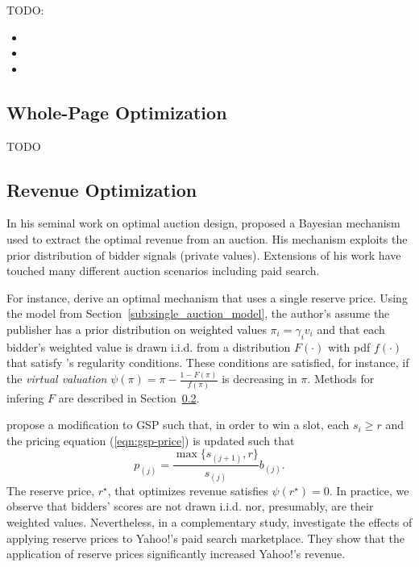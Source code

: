 \documentclass[prodmode,acmtist]{acmsmall} %
\begin{document}
TODO:
\begin{itemize}
	\item {}
	\item {}
	\item {}
\end{itemize}	



\subsection{Whole-Page Optimization} %
\label{sub:whole_page_optimization}

TODO



\subsection{Revenue Optimization} %
\label{sub:revenue_optimization}

In his seminal work on optimal auction design,  proposed a Bayesian mechanism used to extract the optimal revenue from an auction.
His mechanism exploits the prior distribution of bidder signals (private values).
Extensions of his work have touched many different auction scenarios including paid search. 

For instance,  derive an optimal mechanism that uses a single reserve price.
Using the model from Section~\ref{sub:single_auction_model}, the author's assume the publisher has a prior distribution on weighted values $\pi_i = \gamma_i v_i$ and that each bidder's weighted value is drawn i.i.d. from a distribution $F(\cdot)$ with pdf $f(\cdot)$ that satisfy 's regularity conditions.
These conditions are satisfied, for instance, if the \emph{virtual valuation} $\psi(\pi) = \pi - \frac{1 - F(\pi)}{f(\pi)}$ is decreasing in $\pi$.
Methods for infering $F$ are described in Section~\ref{sub:revenue_optimization}.

 propose a modification to GSP such that, in order to win a slot, each $s_i \ge r$ and the pricing equation (\ref{eqn:gsp-price}) is updated such that
\begin{equation}
p_{(j)} = \frac{\max\{s_{(j+1)},r\}}{s_{(j)}} b_{(j)}.
\label{eqn:gsp-reserve-price}	
\end{equation}
The reserve price, $r^\star$, that optimizes revenue satisfies $\psi(r^\star) = 0$.
In practice, we observe that bidders' scores are not drawn i.i.d. nor, presumably, are their weighted values.
Nevertheless, in a complementary study,  investigate the effects of applying reserve prices to Yahoo!'s paid search marketplace.  
They show that the application of reserve prices significantly increased Yahoo!'s revenue.
\end{document}
